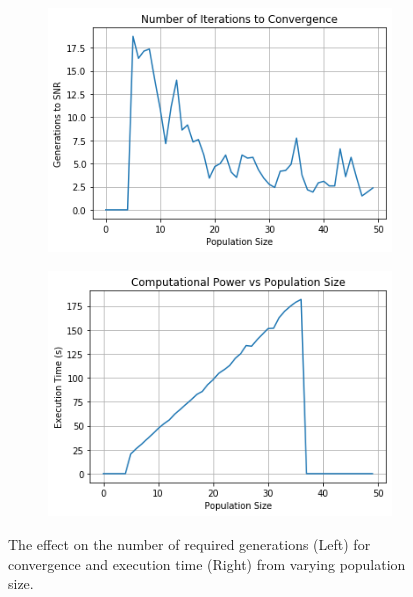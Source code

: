 \documentclass[a4paper, 11pt]{article}
\begin{document}
    \begin{figure}[h!]
        \centering  
        \begin{subfigure}[b]{0.4\linewidth}
            \graphicspath{{./wiki/}}
            \includegraphics[width=\linewidth]{GenPerPopSize.png}
        \end{subfigure}
        \begin{subfigure}[b]{0.4\linewidth}
            \graphicspath{{./wiki/}}
            \includegraphics[width=\linewidth]{ExPerPopSize.png}
        \end{subfigure}
        \caption{The effect on the number of required generations (Left) for convergence and execution time (Right) from varying
        population size. }
        \label{Fig:discuss_2}
    \end{figure}
\end{document}
